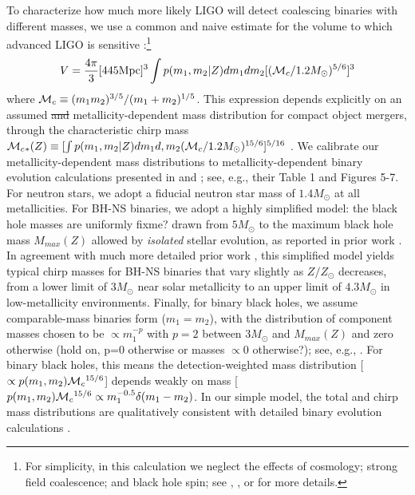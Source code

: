 \documentclass[nofootinbib,twocolumn,prd]{emulateapj}
\newcommand\mc{{\cal M}_c{}}
\newcommand\editremark[1]{{\color{red}#1}}
\newcommand\jillianremark[1]{{\color{blue}#1}}
\newcommand\unit[1]{\text{#1}}
\begin{document}
\begin{widetext}
To characterize how much more likely LIGO will detect coalescing binaries with different masses, we use a common and
naive estimate for the volume to which advanced LIGO is sensitive \citep[see,e.g.,][]{PSellipticals}:\footnote{For
  simplicity, in this calculation we neglect the effects of cosmology; strong field coalescence; and black hole spin;
  see \cite{popsyn-LowMetallicityImpact2c-StarTrackRevised-2014}, \cite{AstroPaper}, or \cite{RatesPaper} for more details.}
\begin{eqnarray}
V = \frac{4\pi}{3} [445 \unit{Mpc}]^3 \int p(m_1,m_2|Z) dm_1 dm_2 [ (\mc/1.2 M_\odot)^{5/6}]^3
\end{eqnarray}
where $\mc\equiv (m_1 m_2)^{3/5}/(m_1+m_2)^{1/5}$.   
This expression depends explicitly on an assumed \jillianremark{\sout{and}} metallicity-dependent mass distribution for compact object
mergers, through the characteristic chirp mass $\mc_{*}(Z)\equiv [\int p(m_1,m_2|Z) dm_1 d,m_2 (\mc/1.2
  M_\odot)^{15/6}]^{5/16}$ .  We calibrate our metallicity-dependent mass distributions to metallicity-dependent binary
evolution calculations presented in \cite{popsyn-LowMetallicityImpact2-StarTrackRevised-2012} and
\cite{popsyn-LowMetallicityImpact2c-StarTrackRevised-2014}; see, e.g., their Table 1 and Figures 5-7.    For neutron
stars, we adopt a fiducial neutron star mass of $1.4 M_\odot$ at all metallicities.  For BH-NS binaries, we adopt a
highly simplified model: the black hole masses are uniformly \editremark{fixme?} drawn from $5 M_\odot$ to the maximum 
black hole mass $M_{max}(Z)$ allowed by
\emph{isolated} stellar evolution, as reported in prior work \citep[see,e.g.][and references
  therein]{gwastro-EventPopsynPaper-2016}.  In agreement with much more detailed prior work \cite{popsyn-LowMetallicityImpact2c-StarTrackRevised-2014}, this simplified model yields typical chirp masses for BH-NS binaries that
vary slightly as $Z/Z_\odot$ decreases, from a lower limit of $3 M_\odot$ near solar metallicity to an upper limit of
$4.3 M_\odot$ in low-metallicity environments.  Finally, for binary black holes, we assume  comparable-mass binaries
form ($m_1=m_2$), with the distribution of component masses chosen to be $\propto m_1^{-p}$ 
 with $p=2$ between $3 M_\odot$ and $M_{max}(Z)$ and zero otherwise \jillianremark{(hold on, p=0 otherwise or masses $ \propto 0$ otherwise?)}; see, e.g.,
\cite{popsyn-LowMetallicityImpact2b-StarTrackRevised-2013}.    For binary black holes, this means  the
detection-weighted mass distribution [$\propto p(m_1,m_2)
\mc^{15/6}$] depends weakly on mass [$ p(m_1,m_2)
\mc^{15/6} \propto m_1^{-0.5} \delta(m_1-m_2)$.  In our simple model, the total  and chirp mass
distributions   are qualitatively consistent with detailed  binary evolution calculations \citep{popsyn-LowMetallicityImpact2b-StarTrackRevised-2013}. 

\end{widetext}
\end{document}

